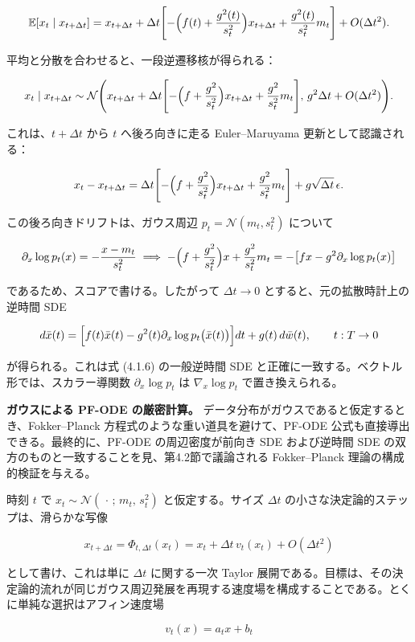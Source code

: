 \[
\mathbb{E}[x_t\mid x_{t+\Delta t}]
= x_{t+\Delta t}
+ \Delta t\Biggl[
-\Bigl(f(t)+\frac{g^2(t)}{s_t^2}\Bigr)x_{t+\Delta t}
+ \frac{g^2(t)}{s_t^2}m_t
\Biggr]
+ O(\Delta t^2).
\]


平均と分散を合わせると、一段逆遷移核が得られる：

\[
x_t\mid x_{t+\Delta t}
\sim \mathcal{N}\Biggl(
x_{t+\Delta t}
+ \Delta t\Biggl[
-\Bigl(f+\frac{g^2}{s_t^2}\Bigr)x_{t+\Delta t}
+ \frac{g^2}{s_t^2}m_t
\Biggr],\,
g^2\Delta t+O(\Delta t^2)
\Biggr).
\]


これは、$t+\Delta t$ から $t$ へ後ろ向きに走る Euler–Maruyama 更新として認識される：

\[
x_t - x_{t+\Delta t}
= \Delta t\Biggl[
-\Bigl(f+\frac{g^2}{s_t^2}\Bigr)x_{t+\Delta t}
+ \frac{g^2}{s_t^2}m_t
\Biggr]
+ g\sqrt{\Delta t}\,\epsilon.
\]


この後ろ向きドリフトは、ガウス周辺 $p_t=\mathcal{N}(m_t,s_t^2)$ について

\[
\partial_x\log p_t(x)=-\frac{x-m_t}{s_t^2}
\implies
-\Bigl(f+\frac{g^2}{s_t^2}\Bigr)x+\frac{g^2}{s_t^2}m_t
= -\bigl[f x - g^2\partial_x\log p_t(x)\bigr]
\]


であるため、スコアで書ける。したがって $\Delta t\to 0$ とすると、元の拡散時計上の逆時間 SDE

\[
d\bar{x}(t)=\Bigl[f(t)\bar{x}(t)-g^2(t)\partial_x\log p_t\bigl(\bar{x}(t)\bigr)\Bigr]dt + g(t)\,d\bar{w}(t),
\qquad t:T\to 0
\]


が得られる。これは式 (4.1.6) の一般逆時間 SDE と正確に一致する。ベクトル形では、スカラー導関数 $\partial_x\log p_t$ は $\nabla_x\log p_t$ で置き換えられる。

\textbf{ガウスによる PF-ODE の厳密計算。} データ分布がガウスであると仮定するとき、Fokker–Planck 方程式のような重い道具を避けて、PF-ODE 公式も直接導出できる。最終的に、PF-ODE の周辺密度が前向き SDE および逆時間 SDE の双方のものと一致することを見、第4.2節で議論される Fokker–Planck 理論の構成的検証を与える。

時刻 $t$ で $x_t\sim\mathcal{N}(\,\cdot\,;\, m_t,\, s_t^2)$ と仮定する。サイズ $\Delta t$ の小さな決定論的ステップは、滑らかな写像

\[
x_{t+\Delta t}=\Phi_{t,\Delta t}(x_t)=x_t+\Delta t\, v_t(x_t)+O(\Delta t^2)
\]


として書け、これは単に $\Delta t$ に関する一次 Taylor 展開である。目標は、その決定論的流れが同じガウス周辺発展を再現する速度場を構成することである。とくに単純な選択はアフィン速度場

\[
v_t(x)=a_t x + b_t
\]



